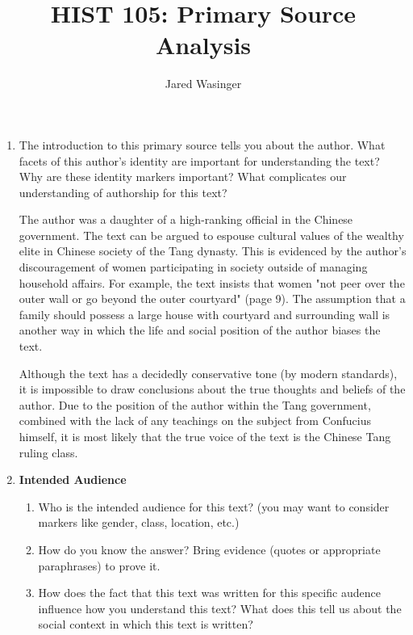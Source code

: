 \documentclass{article}
\begin{document}
  \title{ HIST 105: Primary Source Analysis}
  \author{Jared Wasinger}
  
  \maketitle

  \begin{enumerate}
    \item The introduction to this primary source tells you about the author.  What facets of this author's identity are important for understanding the text? Why are these identity markers important? What complicates our understanding of authorship for this text?
      
      The author was a daughter of a high-ranking official in the Chinese government.  The text can be argued to espouse cultural values of the wealthy elite in Chinese society of the Tang dynasty.  This is evidenced by the author's discouragement of women participating in society outside of managing household affairs.  For example, the text insists that women "not peer over the outer wall or go beyond the outer courtyard" (page 9).  The assumption that a family should possess a large house with courtyard and surrounding wall is another way in which the life and social position of the author biases the text.

      Although the text has a decidedly conservative tone (by modern standards), it is impossible to draw conclusions about the true thoughts and beliefs of the author.  Due to the position of the author within the Tang government, combined with the lack of any teachings on the subject from Confucius himself, it is most likely that the true voice of the text is the Chinese Tang ruling class.
      

    \item \textbf{Intended Audience}
      \begin{enumerate}
      \item Who is the intended audience for this text? (you may want to consider markers like gender, class, location, etc.)



      \item How do you know the answer? Bring evidence (quotes or appropriate paraphrases) to prove it.
      \item How does the fact that this text was written for this specific audence influence how you understand this text? What does this tell us about the social context in which this text is written?


\end{enumerate}
\end{enumerate}
\end{document}
